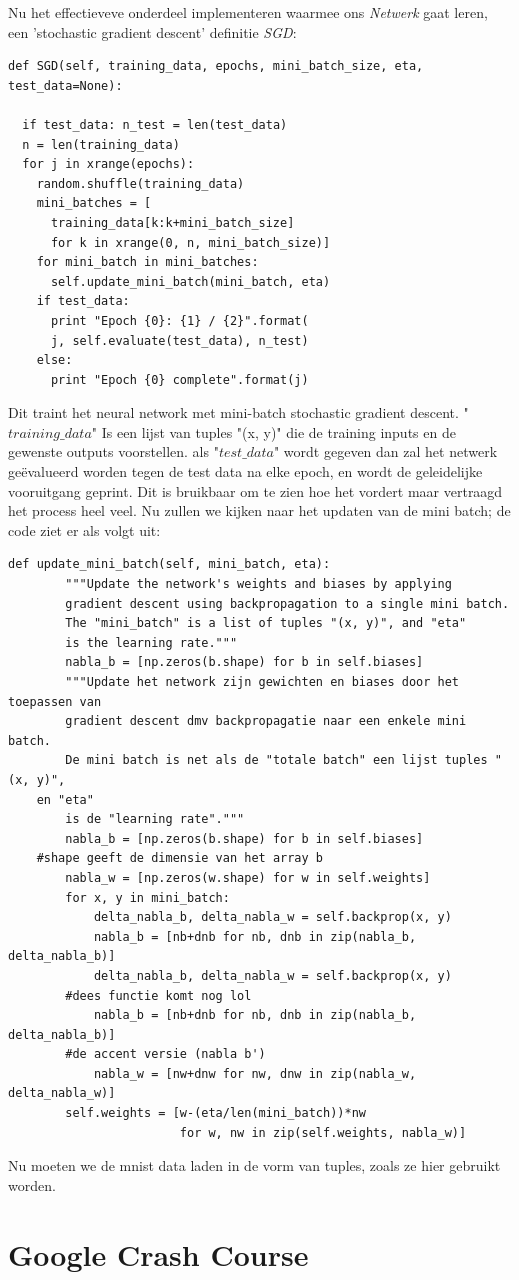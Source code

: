 \documentclass[10pt,a4paper,twoside]{article}
\begin{document}
Nu het effectieveve onderdeel implementeren waarmee ons \textit{Netwerk} gaat leren, een 'stochastic gradient descent' definitie \textit{SGD}:
\begin{verbatim}
def SGD(self, training_data, epochs, mini_batch_size, eta,
test_data=None):

  if test_data: n_test = len(test_data)
  n = len(training_data)
  for j in xrange(epochs):
    random.shuffle(training_data)
    mini_batches = [
      training_data[k:k+mini_batch_size]
      for k in xrange(0, n, mini_batch_size)]
    for mini_batch in mini_batches:
      self.update_mini_batch(mini_batch, eta)
    if test_data:
      print "Epoch {0}: {1} / {2}".format(
      j, self.evaluate(test_data), n_test)
    else:
      print "Epoch {0} complete".format(j)
\end{verbatim}
Dit traint het neural network met mini-batch stochastic
gradient descent. "$training\_data$" Is een lijst van tuples
"(x, y)" die de training inputs en de gewenste
outputs voorstellen. als "$test\_data$" wordt gegeven dan zal het
netwerk geëvalueerd worden tegen de test data na elke
epoch, en wordt de geleidelijke vooruitgang geprint. Dit is bruikbaar om te zien hoe het vordert
maar vertraagd het process heel veel.
Nu zullen we kijken naar het updaten van de mini batch; de code ziet er als volgt uit:
\newpage
\begin{verbatim}
def update_mini_batch(self, mini_batch, eta):
        """Update the network's weights and biases by applying
        gradient descent using backpropagation to a single mini batch.
        The "mini_batch" is a list of tuples "(x, y)", and "eta"
        is the learning rate."""
        nabla_b = [np.zeros(b.shape) for b in self.biases]
        """Update het network zijn gewichten en biases door het toepassen van
        gradient descent dmv backpropagatie naar een enkele mini batch.
        De mini batch is net als de "totale batch" een lijst tuples "(x, y)", 
	en "eta"
        is de "learning rate"."""
        nabla_b = [np.zeros(b.shape) for b in self.biases] 
	#shape geeft de dimensie van het array b
        nabla_w = [np.zeros(w.shape) for w in self.weights]
        for x, y in mini_batch:
            delta_nabla_b, delta_nabla_w = self.backprop(x, y)
            nabla_b = [nb+dnb for nb, dnb in zip(nabla_b, delta_nabla_b)]
            delta_nabla_b, delta_nabla_w = self.backprop(x, y) 
	    #dees functie komt nog lol
            nabla_b = [nb+dnb for nb, dnb in zip(nabla_b, delta_nabla_b)] 
	    #de accent versie (nabla b')
            nabla_w = [nw+dnw for nw, dnw in zip(nabla_w, delta_nabla_w)]
        self.weights = [w-(eta/len(mini_batch))*nw
                        for w, nw in zip(self.weights, nabla_w)]
\end{verbatim}
Nu moeten we de mnist data laden in de vorm van tuples, zoals ze hier gebruikt worden.
\newpage

\section{Google Crash Course}



\end{document}
